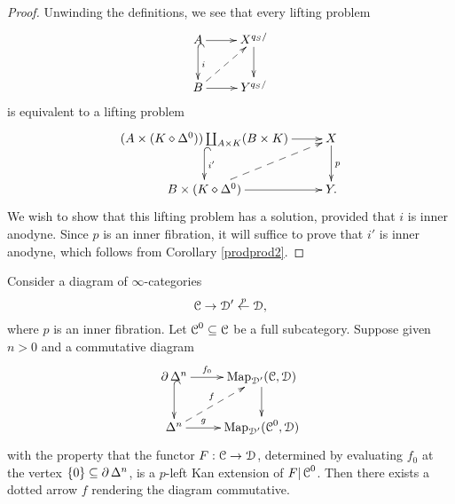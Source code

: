 \begin{proof}
Unwinding the definitions, we see that every lifting problem
$$ \xymatrix{ A \ar@{^{(}->}[d]^{i} \ar[r] & X^{q_{S}/} \ar[d] \\
B \ar[r] \ar@{-->}[ur] & Y^{q_{S}/} }$$
is equivalent to a lifting problem
$$ \xymatrix{ (A \times (K \diamond \Delta^0) ) \coprod_{ A \times K} (B \times K) \ar[r] \ar@{^{(}->}[d]^{i'} & X \ar[d]^{p} \\
B \times (K \diamond \Delta^0) \ar@{-->}[ur] \ar[r] & Y. }$$
We wish to show that this lifting problem has a solution, provided that $i$ is inner anodyne.
Since $p$ is an inner fibration, it will suffice to prove that $i'$ is inner anodyne, which follows from 
Corollary \ref{prodprod2}.
\end{proof}

\begin{lemma}\label{kan1}
Consider a diagram of $\infty$-categories
$$ \operatorname{\mathcal{C}} \rightarrow \operatorname{\mathcal{D}}' \stackrel{p}{\leftarrow} \operatorname{\mathcal{D}},$$
where $p$ is an inner fibration. Let $\operatorname{\mathcal{C}}^{0} \subseteq \operatorname{\mathcal{C}}$ be a full subcategory.
Suppose given $n > 0$ and a commutative diagram
$$ \xymatrix{ \bd \Delta^n \ar@{^{(}->}[d] \ar[r]^-{f_0} & \bHom_{\calD'}(\calC, \calD) \ar[d] \\
\Delta^n \ar[r]^-{g} \ar@{-->}[ur]^-{f} & \bHom_{\calD'}(\calC^{0},\calD) }$$
with the property that the functor $F: \operatorname{\mathcal{C}} \rightarrow \operatorname{\mathcal{D}}$, determined by
evaluating $f_0$ at the vertex $\{0\} \subseteq \operatorname{\partial} \Delta^n$, is a $p$-left Kan extension of
$F| \operatorname{\mathcal{C}}^{0}$. Then there exists a dotted arrow $f$ rendering the diagram commutative.
\end{lemma}

